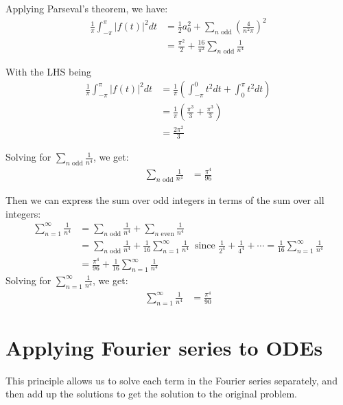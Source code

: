 {Applying Parseval's theorem, we have:
\begin{align*}
\frac{1}{\pi} \int_{-\pi}^{\pi} |f(t)|^2 dt &= \frac{1}{2} a_0^2 + \sum_{n \text{ odd}} \left( \frac{4}{n^2 \pi} \right)^2 \\
&= \frac{\pi^2}{2} + \frac{16}{\pi^2} \sum_{n \text{ odd}} \frac{1}{n^4}
\end{align*}

With the LHS being 
\begin{align*}
\frac{1}{\pi} \int_{-\pi}^{\pi} |f(t)|^2 dt &= \frac{1}{\pi} \left( \int_{-\pi}^{0} t^2 dt + \int_{0}^{\pi} t^2 dt \right) \\
&= \frac{1}{\pi} \left( \frac{\pi^3}{3} + \frac{\pi^3}{3} \right) \\
&= \frac{2 \pi^2}{3}
\end{align*}

Solving for $\sum_{n \text{ odd}} \frac{1}{n^4}$, we get:
\begin{align*}
\sum_{n \text{ odd}} \frac{1}{n^4} &= \frac{\pi^4}{96}
\end{align*}

Then we can express the sum over odd integers in terms of the sum over all integers:
\begin{align*}
\sum_{n=1}^{\infty} \frac{1}{n^4} &= \sum_{n \text{ odd}} \frac{1}{n^4} + \sum_{n \text{ even}} \frac{1}{n^4} \\
&= \sum_{n \text{ odd}} \frac{1}{n^4} + \frac{1}{16} \sum_{n=1}^{\infty} \frac{1}{n^4} \ \text{ since } \frac{1}{2^4} + \frac{1}{4^4} + \cdots = \frac{1}{16} \sum_{n=1}^{\infty} \frac{1}{n^4} \\
&= \frac{\pi^4}{96} + \frac{1}{16} \sum_{n=1}^{\infty} \frac{1}{n^4}
\end{align*}
Solving for $\sum_{n=1}^{\infty} \frac{1}{n^4}$, we get:
\begin{align*}
\sum_{n=1}^{\infty} \frac{1}{n^4} &= \frac{\pi^4}{90}
\end{align*}
}

\section{Applying Fourier series to ODEs}

This principle allows us to solve each term in the Fourier series separately, and then add up the solutions to get the solution to the original problem.

